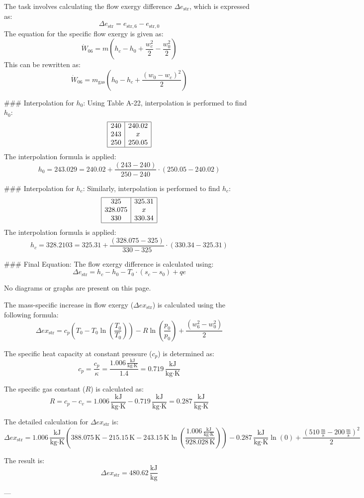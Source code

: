 The task involves calculating the flow exergy difference \( \Delta e_{\text{str}} \), which is expressed as:  
\[
\Delta e_{\text{str}} = e_{\text{str},6} - e_{\text{str},0}
\]  
The equation for the specific flow exergy is given as:  
\[
\dot{W}_{06} = m \left( h_c - h_0 + \frac{w_c^2}{2} - \frac{w_0^2}{2} \right)
\]  
This can be rewritten as:  
\[
\dot{W}_{06} = m_{\text{gas}} \left( h_0 - h_c + \frac{(w_0 - w_c)^2}{2} \right)
\]  

### Interpolation for \( h_0 \):  
Using Table A-22, interpolation is performed to find \( h_0 \):  
\[
\begin{array}{|c|c|}
\hline
240 & 240.02 \\
243 & x \\
250 & 250.05 \\
\hline
\end{array}
\]  
The interpolation formula is applied:  
\[
h_0 = 243.029 = 240.02 + \frac{(243 - 240)}{250 - 240} \cdot (250.05 - 240.02)
\]  

### Interpolation for \( h_c \):  
Similarly, interpolation is performed to find \( h_c \):  
\[
\begin{array}{|c|c|}
\hline
325 & 325.31 \\
328.075 & x \\
330 & 330.34 \\
\hline
\end{array}
\]  
The interpolation formula is applied:  
\[
h_c = 328.2103 = 325.31 + \frac{(328.075 - 325)}{330 - 325} \cdot (330.34 - 325.31)
\]  

### Final Equation:  
The flow exergy difference is calculated using:  
\[
\Delta e_{\text{str}} = h_c - h_0 - T_0 \cdot (s_c - s_0) + qe
\]  

No diagrams or graphs are present on this page.

The mass-specific increase in flow exergy (\( \Delta ex_{\text{str}} \)) is calculated using the following formula:  
\[
\Delta ex_{\text{str}} = c_p (T_0 - T_0 \ln \left( \frac{T_0}{T_0} \right)) - R \ln \left( \frac{p_0}{p_0} \right) + \frac{(w_6^2 - w_0^2)}{2}
\]

The specific heat capacity at constant pressure (\( c_p \)) is determined as:  
\[
c_p = \frac{c_p}{\kappa} = \frac{1.006 \, \frac{\text{kJ}}{\text{kg·K}}}{1.4} = 0.719 \, \frac{\text{kJ}}{\text{kg·K}}
\]

The specific gas constant (\( R \)) is calculated as:  
\[
R = c_p - c_v = 1.006 \, \frac{\text{kJ}}{\text{kg·K}} - 0.719 \, \frac{\text{kJ}}{\text{kg·K}} = 0.287 \, \frac{\text{kJ}}{\text{kg·K}}
\]

The detailed calculation for \( \Delta ex_{\text{str}} \) is:  
\[
\Delta ex_{\text{str}} = 1.006 \, \frac{\text{kJ}}{\text{kg·K}} \left( 388.075 \, \text{K} - 215.15 \, \text{K} - 243.15 \, \text{K} \ln \left( \frac{1.006 \, \frac{\text{kJ}}{\text{kg·K}}}{928.028 \, \text{K}} \right) \right) - 0.287 \, \frac{\text{kJ}}{\text{kg·K}} \ln(0) + \frac{(510 \, \frac{\text{m}}{\text{s}} - 200 \, \frac{\text{m}}{\text{s}})^2}{2}
\]

The result is:  
\[
\Delta ex_{\text{str}} = 480.62 \, \frac{\text{kJ}}{\text{kg}}
\]

---